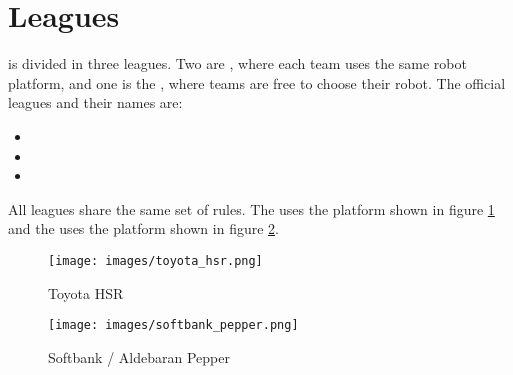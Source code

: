 \section{Leagues}
\label{sec:introduction:leagues}

\AtHome{} is divided in three leagues. Two are \SPLs{}, where each team uses the same robot platform, and one is the \OPL{}, where teams are free to choose their robot. The official leagues and their names are:
\begin{itemize}
  \item \DSPL{}
  \item \SSPL{}
  \item \OPL{}
\end{itemize}

\noindent All leagues share the same set of rules. The \DSPL{} uses the \HSR{} platform shown in figure \ref{fig:toyotaHSR} and the \SSPL{} uses the \PEPPER{} platform shown in figure \ref{fig:softbank-pepper}.

\begin{minipage}{0.5\textwidth}
	\begin{figure}[H]
		\begin{center}
			\texttt{[image: images/toyota\_hsr.png]}
			\caption{Toyota HSR}
			\label{fig:toyotaHSR}
		\end{center}
	\end{figure}
\end{minipage}
\begin{minipage}{0.5\textwidth}
	\begin{figure}[H]
		\begin{center}
			\texttt{[image: images/softbank\_pepper.png]}
			\caption{Softbank / Aldebaran Pepper}
			\label{fig:softbank-pepper}
		\end{center}
	\end{figure}
\end{minipage}
